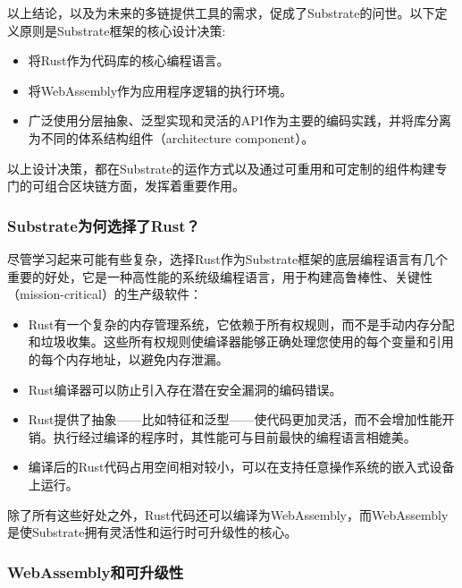 以上结论，以及为未来的多链提供工具的需求，促成了Substrate的问世。以下定义原则是Substrate框架的核心设计决策:

\begin{itemize}
\item
  将Rust作为代码库的核心编程语言。
\item
  将WebAssembly作为应用程序逻辑的执行环境。
\item
  广泛使用分层抽象、泛型实现和灵活的API作为主要的编码实践，并将库分离为不同的体系结构组件（architecture
  component）。
\end{itemize}

以上设计决策，都在Substrate的运作方式以及通过可重用和可定制的组件构建专门的可组合区块链方面，发挥着重要作用。

\hypertarget{substrateux4e3aux4f55ux9009ux62e9ux4e86rust}{%
\subsubsection{Substrate为何选择了Rust？}\label{substrateux4e3aux4f55ux9009ux62e9ux4e86rust}}

尽管学习起来可能有些复杂，选择Rust作为Substrate框架的底层编程语言有几个重要的好处，它是一种高性能的系统级编程语言，用于构建高鲁棒性、关键性（mission-critical）的生产级软件：

\begin{itemize}
\item
  Rust有一个复杂的内存管理系统，它依赖于所有权规则，而不是手动内存分配和垃圾收集。这些所有权规则使编译器能够正确处理您使用的每个变量和引用的每个内存地址，以避免内存泄漏。
\item
  Rust编译器可以防止引入存在潜在安全漏洞的编码错误。
\item
  Rust提供了抽象------比如特征和泛型------使代码更加灵活，而不会增加性能开销。执行经过编译的程序时，其性能可与目前最快的编程语言相媲美。
\item
  编译后的Rust代码占用空间相对较小，可以在支持任意操作系统的嵌入式设备上运行。
\end{itemize}

除了所有这些好处之外，Rust代码还可以编译为WebAssembly，而WebAssembly是使Substrate拥有灵活性和运行时可升级性的核心。

\hypertarget{webassemblyux548cux53efux5347ux7ea7ux6027}{%
\subsubsection{WebAssembly和可升级性}\label{webassemblyux548cux53efux5347ux7ea7ux6027}}

